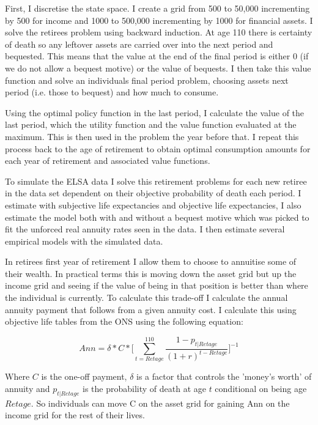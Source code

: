 \documentclass[12pt]{article}
\begin{document}
First, I discretise the state space. I create a grid from 500 to 50,000 incrementing by 500 for income and 1000 to 
500,000 incrementing by 1000 for financial assets. I solve the retirees problem using backward induction. At age 110 there is certainty of death so any leftover assets
are carried over into the next period and bequested. This means that the value at the end of the final period is
either 0 (if we do not allow a bequest motive) or the value of bequests. I then take this value function and solve
an individuals final period problem, choosing assets next period (i.e. those to bequest) and how much to consume.

Using the optimal policy function in the last period, I calculate the value of the last period, which the utility
function and the value function evaluated at the maximum. This is then used in the problem the year before that.
I repeat this process back to the age of retirement to obtain optimal consumption amounts for each year of retirement
and associated value functions.

To simulate the ELSA data I solve this retirement problems for each new retiree in the data set dependent on their
objective probability of death each period. I estimate with subjective life expectancies and objective life expectancies,
I also estimate the model both with and without a bequest motive which was picked to fit the unforced real annuity
rates seen in the data. I then estimate several empirical models with the simulated data.

In retirees first year of retirement I allow them to choose to annuitise some of their wealth. In practical terms 
this is moving down the asset grid but up the income grid and seeing if the value of being in that position is better 
than where the individual is currently. To calculate this trade-off I calculate the annual annuity payment that follows 
from a given annuity cost. I calculate this using objective life tables from the ONS using the following equation:

\begin{equation*}
 Ann = \delta * C * \biggl[\sum_{t = Retage}^{110}\frac{1 - p_{t|Retage}}{(1 + r)^{t - Retage}}\biggr]^{-1}
\end{equation*}

Where $C$ is the one-off payment, $\delta$ is a factor that controls the 'money's worth' of annuity and $p_{t|Retage}$ 
is the probability of death at age $t$ conditional on being age $Retage$. So individuals can move C on the asset grid 
for gaining Ann on the income grid for the rest of their lives.
\end{document}
